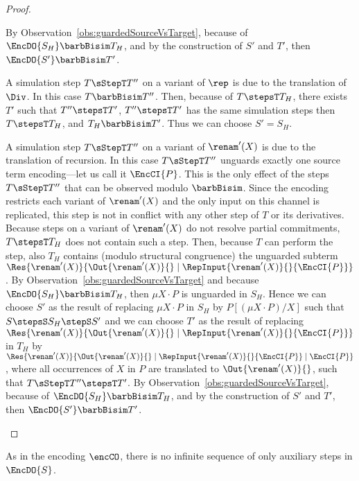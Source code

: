 \documentclass[]{eptcs}
\begin{document}
\begin{proof}
\begin{compactitem}
\begin{compactenum}
					By Observation~\ref{obs:guardedSourceVsTarget}, because of $ \EncDO{S_H} \barbBisim T_H $, and by the construction of $ S' $ and $ T' $, then $ \EncDO{S'} \barbBisim T' $.
				\item A simulation step $ T \sStepT T'' $ on a variant of $ \rep $ is due to the translation of $ \Div $. In this case $ T \barbBisim T'' $. Then, because of $ T \stepsT T_H $, there exists $ T' $ such that $ T'' \stepsT T' $, $ T'' \stepsT T' $ has the same simulation steps then $ T \stepsT T_H $, and $ T_H \barbBisim T' $. Thus we can choose $ S' = S_H $.
				\item A simulation step $ T \sStepT T'' $ on a variant of $ \renam'(X) $ is due to the translation of recursion. In this case $ T \sStepT T'' $ unguards exactly one source term encoding---let us call it $ \EncCI{P} $. This is the only effect of the steps $ T \sStepT T'' $ that can be observed modulo $ \barbBisim $.
					Since the encoding restricts each variant of $ \renam'(X) $ and the only input on this channel is replicated, this step is not in conflict with any other step of $ T $ or its derivatives. Because steps on a variant of $ \renam'(X) $ do not resolve partial commitments, $ T \stepsT T_H $ does not contain such a step. Then, because $ T $ can perform the step, also $ T_H $ contains (modulo structural congruence) the unguarded subterm $ \Res{\renam'(X)}{\Out{\renam'(X)}{} \mid \RepInput{\renam'(X)}{}{\EncCI{P}}} $. By Observation~\ref{obs:guardedSourceVsTarget} and because $ \EncDO{S_H} \barbBisim T_H $, then $ \mu X \cdot P $ is unguarded in $ S_H $.
					Hence we can choose $ S' $ as the result of replacing $ \mu X \cdot P $ in $ S_H $ by $ P\left[ \left( \mu X \cdot P \right) / X \right] $ such that $ S \stepsS S_H \stepS S' $ and we can choose $ T' $ as the result of replacing $ \Res{\renam'(X)}{\Out{\renam'(X)}{} \mid \RepInput{\renam'(X)}{}{\EncCI{P}}} $ in $ T_H $ by $ \Res{\renam'(X)}{\Out{\renam'(X)}{} \mid \RepInput{\renam'(X)}{}{\EncCI{P}} \mid \EncCI{P}} $, where all occurrences of $ X $ in $ P $ are translated to $ \Out{\renam'(X)}{} $, such that $ T \sStepT T'' \stepsT T' $.
					By Observation~\ref{obs:guardedSourceVsTarget}, because of $ \EncDO{S_H} \barbBisim T_H $, and by the construction of $ S' $ and $ T' $, then $ \EncDO{S'} \barbBisim T' $.
			\end{compactenum}
	\end{compactitem}
\end{proof}

As in the encoding $ \encCO $, there is no infinite sequence of only auxiliary steps in $ \EncDO{S} $.
\end{document}
